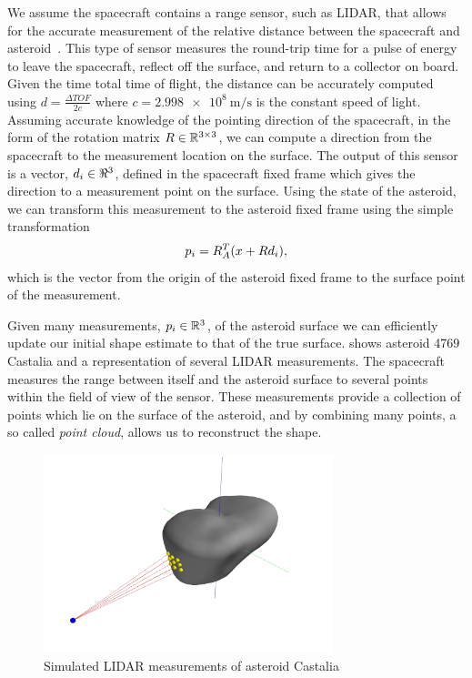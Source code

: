 \documentclass[journal]{new-aiaa}
\newcommand{\todo}[1]{\vspace{5 mm}\par \noindent
\marginpar{\textsc{ToDo}} \framebox{\begin{minipage}[c]{0.95
\textwidth} \tt #1 \end{minipage}}\vspace{5 mm}\par}
\begin{document}
We assume the spacecraft contains a range sensor, such as LIDAR, that allows for the accurate measurement of the relative distance between the spacecraft and asteroid~\cite{zuber1997,zuber2000}.
This type of sensor measures the round-trip time for a pulse of energy to leave the spacecraft, reflect off the surface, and return to a collector on board.
Given the time total time of flight, the distance can be accurately computed using \( d = \frac{\Delta TOF}{2 c} \) where \( c = \SI{2.998e8}{\meter\per\second}\) is the constant speed of light.
Assuming accurate knowledge of the pointing direction of the spacecraft, in the form of the rotation matrix \( R \in \mathbb{R}^{3 \times 3 } \), we can compute a direction from the spacecraft to the measurement location on the surface.
The output of this sensor is a vector, \( d_i\in\Re^3 \), defined in the spacecraft fixed frame which gives the direction to a measurement point on the surface. 
Using the state of the asteroid, we can transform this measurement to the asteroid fixed frame using the simple transformation
\begin{align*}
    p_i = R_A^T (x+R d_i), 
\end{align*}
which is the vector from the origin of the asteroid fixed frame to the surface point of the measurement.
\todo{check the above}
Given many measurements, \( p_i \in \mathbb{R}^3 \), of the asteroid surface we can efficiently update our initial shape estimate to that of the true surface.
 shows asteroid 4769 Castalia and a representation of several LIDAR measurements. 
The spacecraft measures the range between itself and the asteroid surface to several points within the field of view of the sensor. 
These measurements provide a collection of points which lie on the surface of the asteroid, and by combining many points, a so called \textit{point cloud}, allows us to reconstruct the shape.
\begin{figure}
    \centering
    \includegraphics[width=0.75\textwidth]{figures/castalia_raycasting_plot.jpg}
    \caption{Simulated LIDAR measurements of asteroid Castalia~\label{fig:lidar_example}}
\end{figure}
\end{document}
